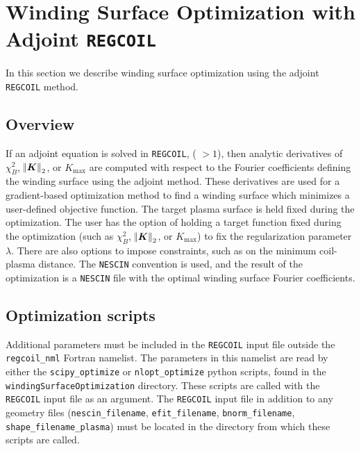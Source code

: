 
\chapter{Winding Surface Optimization with Adjoint \texttt{REGCOIL}}
\label{ch:adjoint}

In this section we describe winding surface optimization using the adjoint \texttt{REGCOIL} method. 

\section{Overview}

If an adjoint equation is solved in \texttt{REGCOIL}, ( $> 1$), then analytic derivatives of $\chi^2_B$, $\norm{\bm{K}}_2$, or $K_{\max}$ are computed with respect to the Fourier coefficients defining the winding surface using the adjoint method. These derivatives are used for a gradient-based optimization method to find a winding surface which minimizes a user-defined objective function. The target plasma surface is held fixed during the optimization. The user has the option of holding a target function fixed during the optimization (such as $\chi^2_B$, $\norm{\bm{K}}_2$, or $K_{\max}$) to fix the regularization parameter $\lambda$. There are also options to impose constraints, such as on the minimum coil-plasma distance. The \texttt{NESCIN} convention is used, and the result of the optimization is a \texttt{NESCIN} file with the optimal winding surface Fourier coefficients. 

\section{Optimization scripts}
Additional parameters must be included in the \texttt{REGCOIL} input file outside the \texttt{regcoil\_nml} Fortran namelist. The parameters in this namelist are read by either the \texttt{scipy\_optimize} or \texttt{nlopt\_optimize} python scripts, found in the \texttt{windingSurfaceOptimization} directory. These scripts are called with the \texttt{REGCOIL} input file as an argument. The \texttt{REGCOIL} input file in addition to any geometry files (\texttt{nescin\_filename}, \texttt{efit\_filename}, \texttt{bnorm\_filename}, \texttt{shape\_filename\_plasma}) must be located in the directory from which these scripts are called. 


